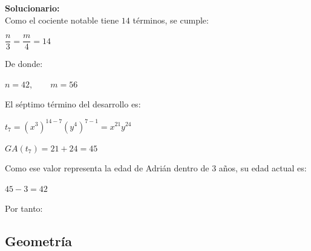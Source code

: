 \begin{enumerate}
	\vspace{2mm}
	\textbf{Solucionario:}\\
	Como el cociente notable tiene $14$ términos, se cumple:
	
	$\dfrac{n}{3}=\dfrac{m}{4}=14$
	
	De donde:
	
	$n=42,\qquad m=56$
	
	El séptimo término del desarrollo es:
	
	$t_7=(x^3)^{14-7}(y^4)^{7-1}=x^{21}y^{24}$
	
	
	$GA(t_7)=21+24=45$
	
	Como ese valor representa la edad de Adrián dentro de $3$ años, su edad actual es:
	
	$45-3=42$
	
	Por tanto:
	
	
	\vspace{6mm}
	
\end{enumerate}

\subsection*{Geometría}


